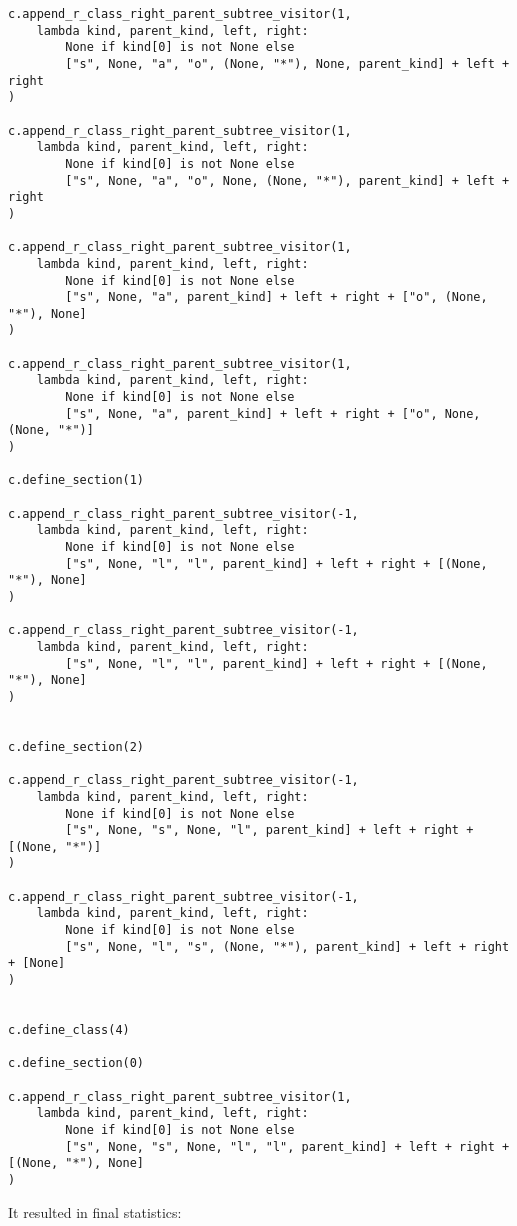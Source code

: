 \documentclass[final]{article}
\theoremstyle{definition}
\theoremstyle{remark}
\begin{document}
\begin{lstlisting}
c.append_r_class_right_parent_subtree_visitor(1,
    lambda kind, parent_kind, left, right:
        None if kind[0] is not None else
        ["s", None, "a", "o", (None, "*"), None, parent_kind] + left + right
)

c.append_r_class_right_parent_subtree_visitor(1,
    lambda kind, parent_kind, left, right:
        None if kind[0] is not None else
        ["s", None, "a", "o", None, (None, "*"), parent_kind] + left + right
)

c.append_r_class_right_parent_subtree_visitor(1,
    lambda kind, parent_kind, left, right:
        None if kind[0] is not None else
        ["s", None, "a", parent_kind] + left + right + ["o", (None, "*"), None]
)

c.append_r_class_right_parent_subtree_visitor(1,
    lambda kind, parent_kind, left, right:
        None if kind[0] is not None else
        ["s", None, "a", parent_kind] + left + right + ["o", None, (None, "*")]
)

c.define_section(1)

c.append_r_class_right_parent_subtree_visitor(-1,
    lambda kind, parent_kind, left, right:
        None if kind[0] is not None else
        ["s", None, "l", "l", parent_kind] + left + right + [(None, "*"), None]
)

c.append_r_class_right_parent_subtree_visitor(-1,
    lambda kind, parent_kind, left, right:
        ["s", None, "l", "l", parent_kind] + left + right + [(None, "*"), None]
)


c.define_section(2)

c.append_r_class_right_parent_subtree_visitor(-1,
    lambda kind, parent_kind, left, right:
        None if kind[0] is not None else
        ["s", None, "s", None, "l", parent_kind] + left + right + [(None, "*")]
)

c.append_r_class_right_parent_subtree_visitor(-1,
    lambda kind, parent_kind, left, right:
        None if kind[0] is not None else
        ["s", None, "l", "s", (None, "*"), parent_kind] + left + right + [None]
)


c.define_class(4)

c.define_section(0)

c.append_r_class_right_parent_subtree_visitor(1,
    lambda kind, parent_kind, left, right:
        None if kind[0] is not None else
        ["s", None, "s", None, "l", "l", parent_kind] + left + right + [(None, "*"), None]
)
\end{lstlisting}

It resulted in final statistics:
\end{document}
